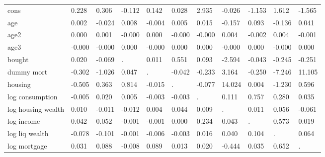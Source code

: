 \begin{table}[htbp]
\begin{tabular}{lllllllllll}
cons &     0.228 &     0.306 &    -0.112 &     0.142 &     0.028 &     2.935 &    -0.026 &    -1.153 &     1.612 &    -1.565 \\  
age &     0.002 &    -0.024 &     0.008 &    -0.004 &     0.005 &     0.015 &    -0.157 &     0.093 &    -0.136 &     0.041 \\  
age2 &     0.000 &     0.001 &    -0.000 &     0.000 &    -0.000 &    -0.000 &     0.004 &    -0.002 &     0.004 &    -0.001 \\  
age3 &    -0.000 &    -0.000 &     0.000 &    -0.000 &     0.000 &     0.000 &    -0.000 &     0.000 &    -0.000 &     0.000 \\  
bought &     0.020 &    -0.069 &         . &     0.011 &     0.551 &     0.093 &    -2.594 &    -0.043 &    -0.245 &    -0.251 \\  
dummy mort &    -0.302 &    -1.026 &     0.047 &         . &    -0.042 &    -0.233 &     3.164 &    -0.250 &    -7.246 &    11.105 \\  
housing &    -0.505 &     0.363 &     0.814 &    -0.015 &         . &    -0.077 &    14.024 &     0.004 &    -1.230 &     0.596 \\  
log consumption &    -0.005 &     0.020 &     0.005 &    -0.003 &    -0.003 &         . &     0.111 &     0.757 &     0.280 &     0.035 \\  
log housing wealth &     0.010 &    -0.011 &    -0.012 &     0.004 &     0.044 &     0.009 &         . &     0.011 &     0.056 &    -0.061 \\  
log income &     0.042 &     0.052 &    -0.001 &    -0.001 &     0.000 &     0.234 &     0.043 &         . &     0.573 &     0.019 \\  
log liq wealth &    -0.078 &    -0.101 &    -0.001 &    -0.006 &    -0.003 &     0.016 &     0.040 &     0.104 &         . &     0.064 \\  
log mortgage &     0.031 &     0.088 &    -0.008 &     0.089 &     0.013 &     0.020 &    -0.444 &     0.035 &     0.652 &         . \\  
\hline \hline \end{tabular}
\end{table}
